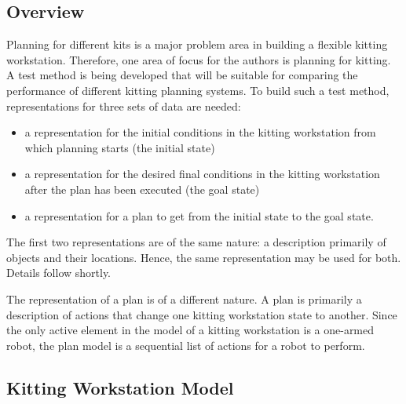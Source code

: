 \subsection{Overview}

Planning for different kits is a major problem area in building a
flexible kitting workstation. Therefore, one area of focus for the
authors is planning for
kitting.  A test method is being developed that will be suitable for
comparing the performance of different kitting planning systems.  To build
such a test method, representations for three sets of data are needed:
\begin{itemize}
\item a representation for the initial conditions in the kitting workstation
 from which planning starts (the initial state)

\item a representation for the desired final conditions in the kitting 
workstation after the plan has been executed (the goal state)

\item a representation for a plan to get from the initial state to the goal
state.
\end{itemize}

The first two representations are of the same nature: a description
primarily of objects and their locations. Hence, the same representation
may be used for both. Details follow shortly.

The representation of a plan is of a different nature. A plan is primarily
a description of actions that change one kitting workstation state to
another. Since the only active element in the model of a kitting
workstation is a one-armed robot, the plan model is a sequential
list of actions for a robot to perform.

\subsection{Kitting Workstation Model}


